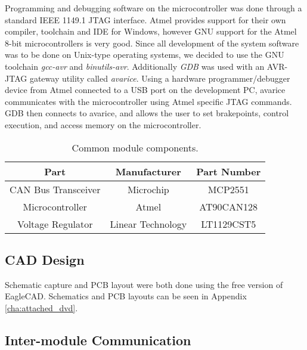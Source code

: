 Programming and debugging software on the microcontroller was done through a standard IEEE 1149.1 JTAG interface. Atmel provides support for their own compiler, toolchain and IDE for Windows, however GNU support for the Atmel 8-bit microcontrollers is very good. Since all development of the system software was to be done on Unix-type operating systems, we decided to use the GNU toolchain \emph{gcc-avr} and \emph{binutils-avr}. Additionally \emph{GDB} was used with an AVR-JTAG gateway utility called \emph{avarice}. Using a hardware programmer/debugger device from Atmel connected to a USB port on the development PC, avarice communicates with the microcontroller using Atmel specific JTAG commands. GDB then connects to avarice, and allows the user to set brakepoints, control execution, and access memory on the microcontroller.


\begin{table}[H]
	\caption{Common module components.}
	\label{tab:common_module_components}
	\centering
	\begin{tabular}{|c|c|c|}
		\hline 
		Part & Manufacturer & Part Number\tabularnewline 
		\hline \hline
		CAN Bus Transceiver & Microchip & MCP2551\tabularnewline \hline
		Microcontroller & Atmel & AT90CAN128\tabularnewline \hline
		Voltage Regulator & Linear Technology & LT1129CST5\tabularnewline		
		\hline
	\end{tabular}
\end{table}

\subsection{CAD Design}

Schematic capture and PCB layout were both done using the free version of EagleCAD. Schematics and PCB layouts can be seen in Appendix \ref{cha:attached_dvd}.


\subsection{Inter-module Communication\label{sec:inter_module_communication}}



